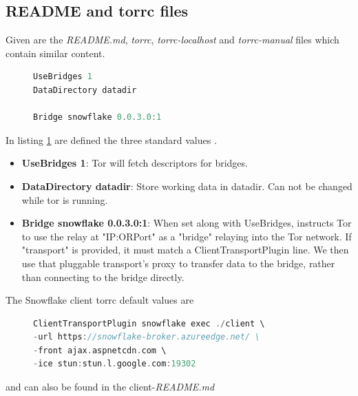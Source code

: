 \documentclass{amsart}
\theoremstyle{definition}
\theoremstyle{remark}
\numberwithin{equation}{section}
\begin{document}
\subsection{README and torrc files}
\label{ss:readmeandtorrcfiles}
Given are the \textit{README.md}, \textit{torrc}, \textit{torrc-localhost} and \textit{torrc-manual} files which contain similar content.

\begin{figure}[H]
\begin{lstlisting}[frame=single, language=C, caption=torrc-Config: Standard values]
UseBridges 1
DataDirectory datadir

Bridge snowflake 0.0.3.0:1
\end{lstlisting}
\label{fig:torrcconfigstandardvalues}
\end{figure}

In listing \ref{fig:torrcconfigstandardvalues} are defined the three standard values \cite{TorStableManual}.
\begin{itemize}
    \item \textbf{UseBridges 1}: Tor will fetch descriptors for bridges.
    \item \textbf{DataDirectory datadir}: Store working data in datadir. Can not be changed while tor is running.
    \item \textbf{Bridge snowflake 0.0.3.0:1}: When set along with UseBridges, instructs Tor to use the relay at "IP:ORPort" as a "bridge" relaying into the Tor network. If "transport" is provided, it must match a ClientTransportPlugin line. We then use that pluggable transport’s proxy to transfer data to the bridge, rather than connecting to the bridge directly.
\end{itemize}

The Snowflake client torrc default values are

\begin{figure}[H]
\begin{lstlisting}[frame=single, language=C, caption=torrc-Config: Snowflake client default values]
ClientTransportPlugin snowflake exec ./client \
-url https://snowflake-broker.azureedge.net/ \
-front ajax.aspnetcdn.com \
-ice stun:stun.l.google.com:19302
\end{lstlisting}
\label{fig:torrcconfigsnowflakeclientdefault}
\end{figure}

and can also be found in the client-\textit{README.md} \cite{SnowflakeGitClient}
\end{document}
